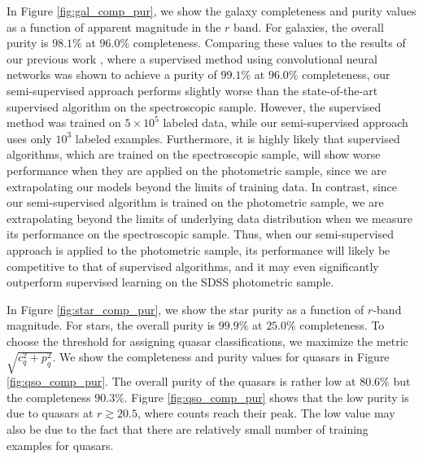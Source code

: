 In Figure \ref{fig:gal_comp_pur}, we show the galaxy completeness and purity values as a function of apparent magnitude
in the $r$ band.
For galaxies, the overall purity is $98.1\%$ at $96.0\%$ completeness.
Comparing these values to the results of our previous work \citep{kim2017star},
where a supervised method using convolutional neural networks
was shown to achieve a purity of $99.1\%$ at $96.0\%$ completeness,
our semi-supervised approach performs slightly worse than the state-of-the-art supervised algorithm on the spectroscopic sample.
However, the supervised method was trained on $5 \times 10^5$ labeled data,
while our semi-supervised approach uses only $10^3$ labeled examples.
Furthermore, it is highly likely that supervised algorithms, which are
trained on the spectroscopic sample, will show worse performance when they are applied on the photometric sample,
since we are extrapolating our models beyond the limits of training data.
In contrast, since our semi-supervised algorithm is trained on the photometric sample, we are
extrapolating beyond the limits of underlying data distribution when we measure its performance on
the spectroscopic sample.
Thus, when our semi-supervised approach is applied to the photometric sample, its performance will likely be
competitive to that of supervised algorithms, and it may even significantly outperform supervised learning
on the SDSS photometric sample.

In Figure \ref{fig:star_comp_pur}, we show the star purity as a function of $r$-band magnitude.
For stars, the overall purity is $99.9\%$ at $25.0\%$ completeness.
To choose the threshold for assigning quasar classifications, we maximize the metric $\sqrt{ c_q^2 + p_q^2 }$.
We show the completeness and purity values for quasars in Figure \ref{fig:qso_comp_pur}.
The overall purity of the quasars is rather low at $80.6\%$ but the completeness $90.3\%$.
Figure \ref{fig:qso_comp_pur} shows that the low purity is due to quasars at $r \gtrsim 20.5$,
where counts reach their peak.
The low value may also be due to the fact that there are relatively small number of training examples for quasars.


